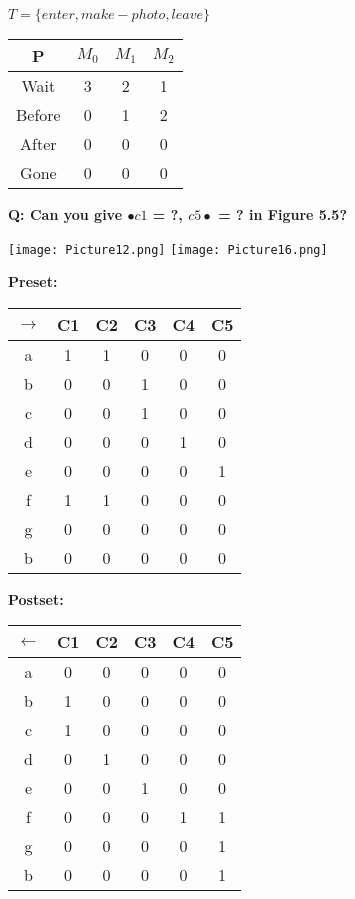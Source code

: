 \documentclass[a4paper]{article}
\begin{document}
$T = \{enter, make-photo, leave\}$
\begin{center}
    \begin{tabular}{|c|c|c|c|}
    \hline
        P & $M_{0}$ & $M_{1}$ & $M_{2}$\\
    \hline
        Wait & 3 & 2 & 1\\
    \hline
        Before & 0 & 1 & 2\\
    \hline
        After & 0 & 0 & 0\\
    \hline
        Gone & 0 & 0 & 0\\
    \hline
    \end{tabular}
\end{center}

\vspace{1 cm}

\textbf{Q: Can you give $\bullet c1$ = ?, $c5 \bullet$ = ? in Figure 5.5?}

\begin{center}
    \texttt{[image: Picture12.png]}
    \texttt{[image: Picture16.png]}
\end{center}

\textbf{Preset:}
\begin{center}
    \begin{tabular}{|c|c|c|c|c|c|}
    \hline
        $\rightarrow$ & C1 & C2 & C3 & C4 & C5 \\
    \hline
        a & 1 & 1 & 0 & 0 & 0 \\
    \hline
        b & 0 & 0 & 1 & 0 & 0 \\
    \hline
        c & 0 & 0 & 1 & 0 & 0 \\
    \hline
        d & 0 & 0 & 0 & 1 & 0 \\
    \hline
        e & 0 & 0 & 0 & 0 & 1 \\
    \hline
        f & 1 & 1 & 0 & 0 & 0 \\
    \hline
        g & 0 & 0 & 0 & 0 & 0 \\
    \hline
        b & 0 & 0 & 0 & 0 & 0 \\
    \hline
    \end{tabular}
\end{center}

\textbf{Postset:}
\begin{center}
    \begin{tabular}{|c|c|c|c|c|c|}
    \hline
        $\leftarrow$ & C1 & C2 & C3 & C4 & C5 \\
    \hline
        a & 0 & 0 & 0 & 0 & 0 \\
    \hline
        b & 1 & 0 & 0 & 0 & 0 \\
    \hline
        c & 1 & 0 & 0 & 0 & 0 \\
    \hline
        d & 0 & 1 & 0 & 0 & 0 \\
    \hline
        e & 0 & 0 & 1 & 0 & 0 \\
    \hline
        f & 0 & 0 & 0 & 1 & 1 \\
    \hline
        g & 0 & 0 & 0 & 0 & 1 \\
    \hline
        b & 0 & 0 & 0 & 0 & 1 \\
    \hline
    \end{tabular}
\end{center}
\end{document}
